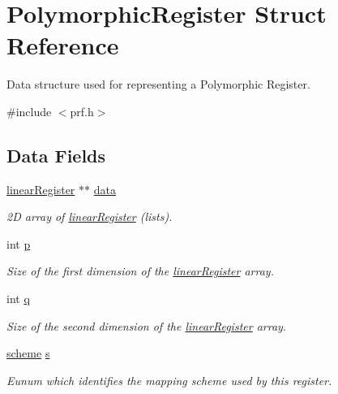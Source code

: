 \hypertarget{struct_polymorphic_register}{}\section{Polymorphic\+Register Struct Reference}
\label{struct_polymorphic_register}


Data structure used for representing a Polymorphic Register.  




{\ttfamily \#include $<$prf.\+h$>$}

\subsection*{Data Fields}
\begin{DoxyCompactItemize}
\item 
\hyperlink{structlinear_register}{linear\+Register} $\ast$$\ast$ \hyperlink{struct_polymorphic_register_a63cd536ae44db7801d00fb7fb2b1ce82}{data}
\begin{DoxyCompactList}\small\item\em 2\+D array of \hyperlink{structlinear_register}{linear\+Register} (lists). \end{DoxyCompactList}\item 
int \hyperlink{struct_polymorphic_register_aa3a9c856490b9914ade1c93cf90b647d}{p}
\begin{DoxyCompactList}\small\item\em Size of the first dimension of the \hyperlink{structlinear_register}{linear\+Register} array. \end{DoxyCompactList}\item 
int \hyperlink{struct_polymorphic_register_a67acd3d6240f6bd56f1cdcbef715b718}{q}
\begin{DoxyCompactList}\small\item\em Size of the second dimension of the \hyperlink{structlinear_register}{linear\+Register} array. \end{DoxyCompactList}\item 
\hyperlink{prf_8h_a1a1ed40592bd51f9b25af65953320968}{scheme} \hyperlink{struct_polymorphic_register_a50360b225a043d149cd0b4e6ac4fdc05}{s}
\begin{DoxyCompactList}\small\item\em Eunum which identifies the mapping scheme used by this register. \end{DoxyCompactList}\end{DoxyCompactItemize}


